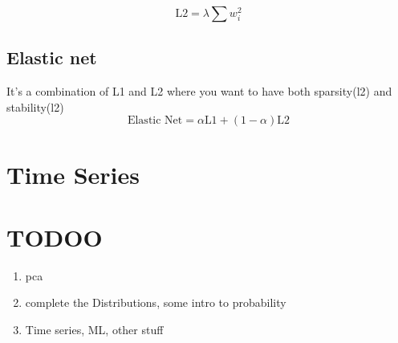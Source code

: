\documentclass[12pt]{extarticle}
\begin{document}
$$ \text{L2} = \lambda \sum w_i^2 $$

\subsection{Elastic net}
It's a combination of L1 and L2 where you want to have both sparsity(l2) 
and stability(l2)
$$ \text{Elastic Net} = \alpha \text{L1} + (1-\alpha)\text{L2} $$


\section{Time Series}


\section{TODOO}
\begin{enumerate}
    \item pca
    \item complete the Distributions, some intro to probability
    \item Time series, ML, other stuff

\end{enumerate}
\end{document}

